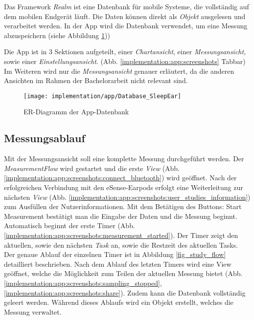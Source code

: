 Das Framework \textit{Realm} ist eine Datenbank für mobile Systeme, die vollständig auf dem mobilen Endgerät läuft.
Die Daten können direkt als \textit{Objekt} ausgelesen und verarbeitet werden.
In der App wird die Datenbank verwendet, um eine Messung abzuspeichern (siehe Abbildung \ref{implementation:app:erModel}))

Die App ist in 3 Sektionen aufgeteilt, einer \textit{Chartansicht}, einer \textit{Messungsansicht}, sowie einer \textit{Einstellungsansicht}. 
(Abb. \ref{implementation:app:screenshots} Tabbar)
Im Weiteren wird nur die \textit{Messungsansicht} genauer erläutert, da die anderen Ansichten im Rahmen der Bachelorarbeit nicht relevant sind.

\begin{figure}[ht]
  \centering
  \texttt{[image: implementation/app/Database\_SleepEar]}
  \caption{ER-Diagramm der App-Datenbank}
  \label{implementation:app:erModel}
\end{figure}

\subsection{Messungsablauf}
\label{ch:Implementierung:app:measurement_procedure}
Mit der Messungsansicht soll eine komplette Messung durchgeführt werden.
Der \textit{MeasurementFlow} wird gestartet und die erste \textit{View} (Abb. \ref{implementation:app:screenshots:connect_bluetooth}) wird geöffnet.
Nach der erfolgreichen Verbindung mit den eSense-Earpods erfolgt eine Weiterleitung zur nächsten \textit{View} (Abb. \ref{implementation:app:screenshots:user_studies_information}) zum Ausfüllen der Nutzerinformationen. 
Mit dem Betätigen des Buttons: {\glqq Start Measurement\grqq} bestätigt man die Eingabe der Daten und die Messung beginnt.
Automatisch beginnt der erste Timer (Abb. \ref{implementation:app:screenshots:measurement_started}).
Der Timer zeigt den aktuellen, sowie den nächsten \textit{Task} an, sowie die Restzeit des aktuellen Tasks.
Der genaue Ablauf der einzelnen Timer ist in Abbildung \ref{fig_study_flow} detailliert beschrieben.
Nach dem Ablauf des letzten Timers wird eine View geöffnet, welche die Möglichkeit zum Teilen der aktuellen Messung bietet (Abb. \ref{implementation:app:screenshots:sampling_stopped}, \ref{implementation:app:screenshots:share}).
Zudem kann die Datenbank vollständig geleert werden.
Während dieses Ablaufs wird ein Objekt erstellt, welches die Messung verwaltet.

